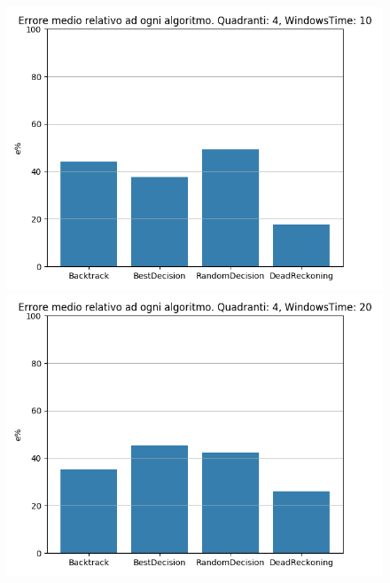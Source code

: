 \documentclass[12pt,a4paper,openright,twoside]{report}
\begin{document}
\begin{figure}[H]
\centering  
\includegraphics[scale=0.4]{secondChart4-10} 
\includegraphics[scale=0.4]{secondChart4-20} 
\end{figure}
\end{document}
